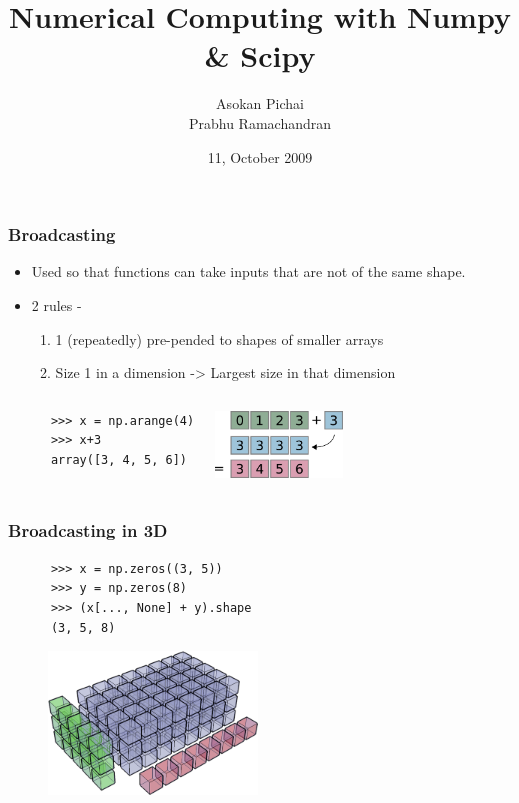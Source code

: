 \documentclass[14pt,compress]{beamer}
\title[]{Numerical Computing with Numpy \& Scipy}
\author[FOSSEE Team] {Asokan Pichai\\Prabhu Ramachandran}
\institute[FOSSEE] {FOSSEE Team}
\date[] {11, October 2009}
\begin{document}
\begin{frame}
  \maketitle
\end{frame}

\begin{frame}[fragile]
  \frametitle{Broadcasting}
  \begin{itemize}
    \item Used so that functions can take inputs that are not of the same shape.
    \item 2 rules -
      \begin{enumerate}
      \item 1 (repeatedly) pre-pended to shapes of smaller arrays
      \item Size 1 in a dimension -> Largest size in that dimension
      \end{enumerate}
  \end{itemize}
  \begin{columns}
    \hspace*{-1.5in}
    \begin{lstlisting}
      >>> x = np.arange(4)
      >>> x+3
      array([3, 4, 5, 6])
    \end{lstlisting}
    \includegraphics[height=0.7in, interpolate=true]{data/broadcast_scalar}
  \end{columns}
\end{frame}

\begin{frame}[fragile]
  \frametitle{Broadcasting in 3D}
    \begin{lstlisting}
      >>> x = np.zeros((3, 5))
      >>> y = np.zeros(8)
      >>> (x[..., None] + y).shape
      (3, 5, 8)
    \end{lstlisting}
    \begin{figure}
      \begin{center}
      \includegraphics[height=1.5in, interpolate=true]{data/array_3x5x8}        
      \end{center}
    \end{figure}
\end{frame}
\end{document}
